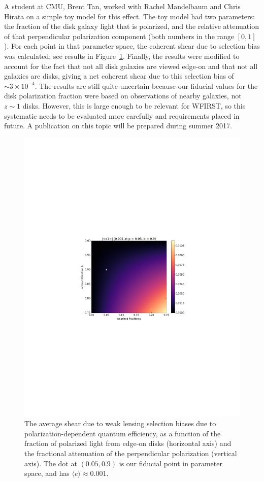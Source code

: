 A student at CMU, Brent Tan, worked with Rachel Mandelbaum and Chris Hirata on a simple toy model
for this effect.  The toy model had two parameters: the fraction of the disk galaxy light that is
polarized, and the relative attenuation of that perpendicular polarization component (both numbers
in the range $[0,1]$).  For each point in that parameter space, the coherent shear due to selection
bias was calculated; see results in Figure~\ref{fig:polarization}.  Finally, the results were
modified to account for the fact that not all disk galaxies are viewed edge-on and that not all
galaxies are disks, giving a net coherent shear due to this selection bias of $\sim 3\times
10^{-4}$.  The results are still quite uncertain because our fiducial values for the disk
polarization fraction were based on observations of nearby galaxies, not $z\sim 1$ disks.  However,
this is large enough to be relevant for WFIRST, so this systematic needs to be evaluated more
carefully and requirements placed in future.  A publication on this topic will be prepared during
summer 2017.
\begin{figure}
\begin{center}
\includegraphics[width=5in]{Plots/polarization-selection.pdf}
\end{center}
\caption{\label{fig:polarization}
The average shear due to weak lensing selection biases due to polarization-dependent quantum
efficiency, as a function of the fraction of polarized light from edge-on disks (horizontal axis)
and the fractional attenuation of the perpendicular polarization (vertical axis).  The dot at
$(0.05,0.9)$ is our fiducial point in parameter space, and has $\langle e\rangle \approx 0.001$.
}
\end{figure}

